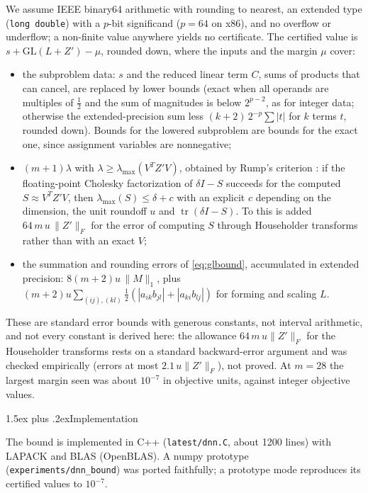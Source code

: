 \documentclass[10pt]{article}
\makeatletter
\renewcommand\subsection{\@startsection{subsection}{2}{\z@}{-3.25ex plus -1ex minus -.2ex}%
  {1.5ex plus .2ex}{\normalfont\normalsize\bfseries}}
\theoremstyle{remark}
\newcommand{\tr}{\operatorname{tr}}
\newcommand{\lmax}{\lambda_{\max}}
\newcommand{\GL}{\mathrm{GL}}
\makeatother
\begin{document}
We assume IEEE binary64 arithmetic with rounding to nearest, an extended type
(\texttt{long double}) with a $p$-bit significand ($p=64$ on x86), and no overflow
or underflow; a non-finite value anywhere yields no certificate. The certified
value is $s + \GL(L+Z') - \mu$, rounded down, where the inputs and the margin $\mu$
cover:
\begin{itemize}
\item[(o)] the subproblem data: $s$ and the reduced linear term $C$, sums of
  products that can cancel, are replaced by lower bounds (exact when all operands
  are multiples of $\frac12$ and the sum of magnitudes is below $2^{p-2}$, as for
  integer data; otherwise the extended-precision sum less $(k+2)\,2^{-p}\sum|t|$
  for $k$ terms $t$, rounded down). Bounds for the lowered subproblem are bounds for
  the exact one, since assignment variables are nonnegative;
\item[(i)] $(m+1)\lambda$ with $\lambda\ge\lmax(V^TZ'V)$, obtained by Rump's
  criterion \cite{rump}: if the floating-point Cholesky factorization of
  $\delta I - S$ succeeds for the computed $S \approx V^TZ'V$, then
  $\lmax(S) \le \delta + c$ with an explicit $c$ depending on the dimension, the
  unit roundoff $u$ and $\tr(\delta I - S)$. To this is added
  $64\,m\,u\,\|Z'\|_F$ for the error of computing $S$ through Householder
  transforms rather than with an exact $V$;
\item[(ii)] the summation and rounding errors of \eqref{eq:glbound}, accumulated in
  extended precision: $8(m+2)u\,\|M\|_1$, plus $(m+2)u\sum_{(ij),(kl)}
  \frac12(|a_{ik}b_{jl}|+|a_{ki}b_{lj}|)$ for forming and scaling $L$.
\end{itemize}
These are standard error bounds with generous constants, not interval arithmetic,
and not every constant is derived here: the allowance $64\,m\,u\|Z'\|_F$ for the
Householder transforms rests on a standard backward-error argument and was checked
empirically (errors at most $2.1\,u\|Z'\|_F$), not proved. At $m=28$ the largest
margin seen was about $10^{-7}$ in objective units, against integer objective
values.

\subsection{Implementation}\label{sec:impl}

The bound is implemented in C++ (\texttt{latest/dnn.C}, about 1200 lines) with
LAPACK and BLAS (OpenBLAS). A numpy prototype (\texttt{experiments/dnn\_bound}) was
ported faithfully; a prototype mode reproduces its certified values to $10^{-7}$.
\end{document}
